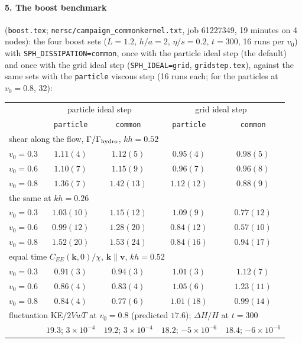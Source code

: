 \documentclass[11pt,aps,preprint,nofootinbib,superscriptaddress,tightenlines]{revtex4-2}
\let\oldparagraph\paragraph
\renewcommand{\paragraph}{\par\bigskip\oldparagraph}
\begin{document}
\paragraph{5. The boost benchmark} (\texttt{boost.tex}; \texttt{nersc/campaign\_commonkernel.txt}, job 61227349, 19 minutes on 4 nodes):
the four boost sets ($L=1.2$, $h/a=2$, $\eta/s=0.2$, $t=300$, 16 runs per $v_0$) with \texttt{SPH\_DISSIPATION=common}, once with
the particle ideal step (the default) and once with the grid ideal step (\texttt{SPH\_IDEAL=grid}, \texttt{gridstep.tex}), against
the same sets with the \texttt{particle} viscous step (16 runs each; for the particles at $v_0=0.8$, 32):
\begin{center}
\begin{tabular}{lcccc}
\hline
 & \multicolumn{2}{c}{particle ideal step} & \multicolumn{2}{c}{grid ideal step} \\
 & \texttt{particle} & \texttt{common} & \texttt{particle} & \texttt{common} \\ \hline
\multicolumn{5}{l}{shear along the flow, $\Gamma/\Gamma_{\rm hydro}$, $kh=0.52$} \\
$v_0=0.3$ & $1.11(4)$ & $1.12(5)$ & $0.95(4)$ & $0.98(5)$ \\
$v_0=0.6$ & $1.10(7)$ & $1.15(9)$ & $0.96(7)$ & $0.96(8)$ \\
$v_0=0.8$ & $1.36(7)$ & $1.42(13)$ & $1.12(12)$ & $0.88(9)$ \\
\multicolumn{5}{l}{the same at $kh=0.26$} \\
$v_0=0.3$ & $1.03(10)$ & $1.15(12)$ & $1.09(9)$ & $0.77(12)$ \\
$v_0=0.6$ & $0.99(12)$ & $1.28(20)$ & $0.84(12)$ & $0.57(10)$ \\
$v_0=0.8$ & $1.52(20)$ & $1.53(24)$ & $0.84(16)$ & $0.94(17)$ \\
\multicolumn{5}{l}{equal time $C_{EE}(\bm k,0)/\chi$, $\bm k\parallel\bm v$, $kh=0.52$} \\
$v_0=0.3$ & $0.91(3)$ & $0.94(3)$ & $1.01(3)$ & $1.12(7)$ \\
$v_0=0.6$ & $0.86(4)$ & $0.83(4)$ & $1.05(6)$ & $1.23(11)$ \\
$v_0=0.8$ & $0.84(4)$ & $0.77(6)$ & $1.01(18)$ & $0.99(14)$ \\
\multicolumn{5}{l}{fluctuation KE$/2VwT$ at $v_0=0.8$ (predicted $17.6$); $\Delta H/H$ at $t=300$} \\
 & $19.3$; $3\times10^{-4}$ & $19.2$; $3\times10^{-4}$ & $18.2$; $-5\times10^{-6}$ & $18.4$; $-6\times10^{-6}$ \\
\hline
\end{tabular}
\end{center}
\end{document}
